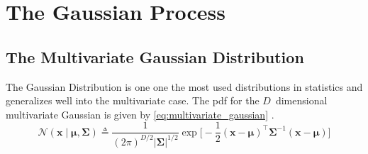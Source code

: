 \chapter{The Gaussian Process}\label{chap:theory}

\section{The Multivariate Gaussian Distribution}
The Gaussian Distribution is one one the most used distributions in statistics \cite{murphy} and generalizes well into the multivariate case. The pdf for the $D$ dimensional multivariate Gaussian is given by \cref{eq:multivariate_gaussian} \cite{murphy}.
\begin{equation}\label{eq:multivariate_gaussian}
    \mathcal{N}(\boldsymbol{x} \; | \; \boldsymbol{\mu}, \boldsymbol{\Sigma}) \triangleq \frac{1}{(2 \pi)^{D/2} |\boldsymbol{\Sigma} | ^{1/2}} \exp \bigg[- \frac{1}{2} (\boldsymbol{x} - \boldsymbol{\mu})^\intercal \boldsymbol{\Sigma}^{-1}(\boldsymbol{x} - \boldsymbol{\mu})\bigg]
\end{equation}

